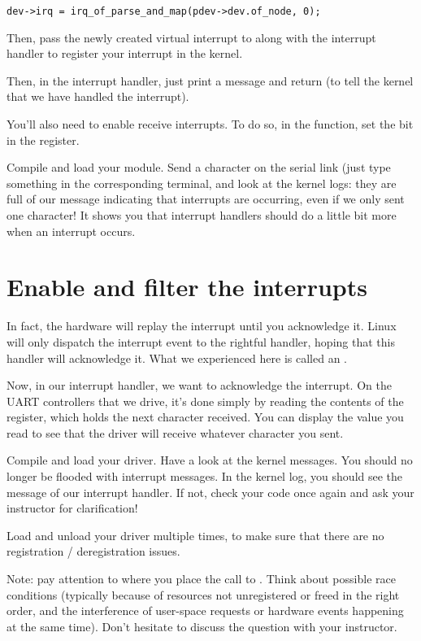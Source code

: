 \begin{verbatim}
dev->irq = irq_of_parse_and_map(pdev->dev.of_node, 0);
\end{verbatim}

Then, pass the newly created virtual interrupt to 
along with the interrupt handler to register your interrupt in the
kernel.

Then, in the interrupt handler, just print a message and return
 (to tell the kernel that we have handled the
interrupt).

You'll also need to enable receive interrupts.
To do so, in the  function, set the
 bit in the  register.

Compile and load your module. Send a character on the serial link (just
type something in the corresponding  terminal, and
look at the kernel logs: they are full of our message indicating that
interrupts are occurring, even if we only sent one character! It shows
you that interrupt handlers should do a little bit more when an
interrupt occurs.

\section{Enable and filter the interrupts}

In fact, the hardware will replay the interrupt until you acknowledge
it. Linux will only dispatch the interrupt event to the rightful
handler, hoping that this handler will acknowledge it. What we
experienced here is called an .

Now, in our interrupt handler, we want to acknowledge the
interrupt. On the UART controllers that we drive, it's done simply by
reading the contents of the  register, which holds the
next character received. You can display the value you read to see
that the driver will receive whatever character you sent.

Compile and load your driver. Have a look at the kernel messages. You
should no longer be flooded with interrupt messages. In the kernel
log, you should see the message of our interrupt handler. If not,
check your code once again and ask your instructor for clarification!

Load and unload your driver multiple times, to make sure that 
there are no registration / deregistration issues.

Note: pay attention to where you place the call to .
Think about possible race conditions (typically because of resources
not unregistered or freed in the right order, and the interference of
user-space requests or hardware events happening at the same time). 
Don't hesitate to discuss the question with your instructor.

